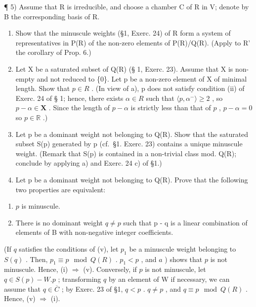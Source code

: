 ¶ 5) Assume that R is irreducible, and choose a chamber C of R in V; denote by B the corresponding basis of R.

\begin{enumerate}
\def\labelenumi{\alph{enumi})}
\item
  Show that the minuscule weights (§1, Exerc. 24) of R form a system of representatives in P(R) of the non-zero elements of P(R)/Q(R). (Apply to R' the corollary of Prop. 6.)
\item
  Let X be a saturated subset of Q(R) (§ 1, Exerc. 23). Assume that X is non-empty and not reduced to \{0\}. Let p be a non-zero element of X of minimal length. Show that \(p \in R\) . (In view of a), p does not satisfy condition (ii) of Exerc. 24 of § 1; hence, there exists \(\alpha \in R\) such that \(\langle p, \alpha^{-} \rangle \geqslant 2\) , so \(p - \alpha \in \mathbf{X}\) . Since the length of \(p - \alpha\) is strictly less than that of \(p\) , \(p - \alpha = 0\) so \(p \in \mathbb{R}\) .)
\item
  Let p be a dominant weight not belonging to Q(R). Show that the saturated subset S(p) generated by p (cf.~§1. Exerc. 23) contains a unique minuscule weight. (Remark that S(p) is contained in a non-trivial class mod. Q(R); conclude by applying a) and Exerc. 24 c) of §1.)
\item
  Let p be a dominant weight not belonging to Q(R). Prove that the following two properties are equivalent:
\end{enumerate}

\begin{enumerate}
\def\labelenumi{(\roman{enumi})}
\item
  \(p\) is minuscule.
\item
  There is no dominant weight \(q \neq p\) such that p - q is a linear combination of elements of B with non-negative integer coefficients.
\end{enumerate}

(If \(q\) satisfies the conditions of (v), let \(p_1\) be a minuscule weight belonging to \(S(q)\) . Then, \(p_1 \equiv p \mod Q(R)\) . \(p_1 < p\) , and \(a\) ) shows that \(p\) is not minuscule. Hence, (i) \(\Longrightarrow\) (v). Conversely, if \(p\) is not minuscule, let \(q \in S(p) - W.p\) ; transforming \(q\) by an element of W if necessary, we can assume that \(q \in \overline{C}\) ; by Exerc. 23 of §1, \(q < p\) . \(q \neq p\) , and \(q \equiv p \mod Q(R)\) . Hence, (v) \(\Longrightarrow\) (i).


